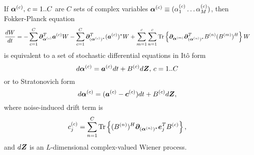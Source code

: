 \begin{theorem}
\label{thm:wigner-bec:fpe:mc-fpe-sde}
If $\boldsymbol{\alpha}^{(c)},\, c = 1..C$ are $C$ sets of complex variables $\boldsymbol{\alpha}^{(c)} \equiv (\alpha_1^{(c)} \ldots \alpha_M^{(c)})$,
then Fokker-Planck equation
\[
	\frac{dW}{dt}
	= - \sum_{c=1}^C \boldsymbol{\partial}_{\boldsymbol{\alpha}^{(c)}}^T \boldsymbol{a}^{(c)} W
	- \sum_{c=1}^C \boldsymbol{\partial}_{(\boldsymbol{\alpha}^{(c)})^*}^T (\boldsymbol{a}^{(c)})^* W
	+ \sum_{m=1}^c \sum_{n=1}^c
		\mathrm{Tr} \left\{ 
			\boldsymbol{\partial}_{\boldsymbol{\alpha}^{(m)}}
			\boldsymbol{\partial}_{(\boldsymbol{\alpha}^{(n)})^*}^T
			B^{(n)} (B^{(m)})^H
		 \right\} W
\]
is equivalent to a set of stochastic differential equations in It\^{o} form
\[
	d\boldsymbol{\alpha}^{(c)} = \boldsymbol{a}^{(c)} dt + B^{(c)} d\boldsymbol{Z},\, c = 1..C
\]
or to Stratonovich form
\[
	d\boldsymbol{\alpha}^{(c)} = (\boldsymbol{a}^{(c)} - \bm{c}^{(c)}) dt + B^{(c)} d\boldsymbol{Z},
\]
where noise-induced drift term is
\[
	c_j^{(c)} = \sum_{n=1}^C
		\mathrm{Tr} \left\{  (B^{(n)})^H \boldsymbol{\partial}_{(\boldsymbol{\alpha}^{(n)})^*} \boldsymbol{e}_j^T B^{(c)}  \right\},
\]
and $d\boldsymbol{Z}$ is an $L$-dimensional complex-valued Wiener process.
\end{theorem}
